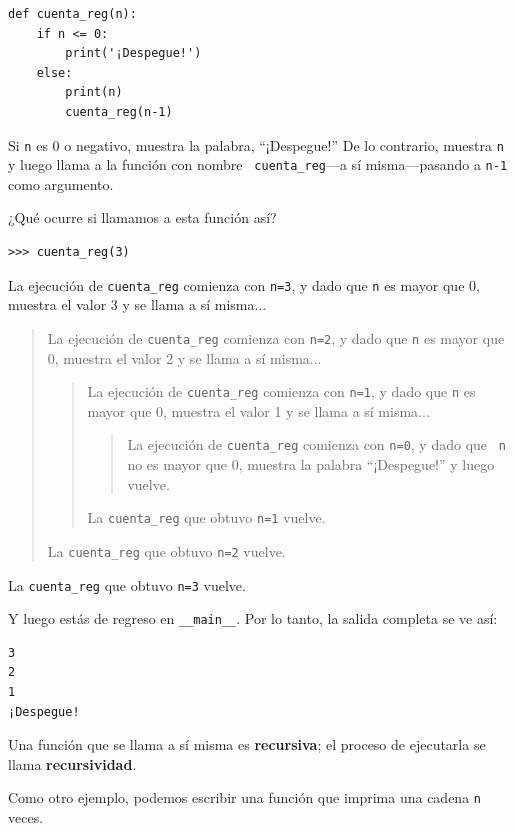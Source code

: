 \documentclass[10pt]{book}
\begin{document}
\begin{verbatim}
def cuenta_reg(n):
    if n <= 0:
        print('¡Despegue!')
    else:
        print(n)
        cuenta_reg(n-1)
\end{verbatim}
%
Si {\tt n} es 0 o negativo, muestra la palabra, ``¡Despegue!''
De lo contrario, muestra {\tt n} y luego llama a la función con nombre {\tt
cuenta\_reg}---a sí misma---pasando a {\tt n-1} como argumento.

¿Qué ocurre si llamamos a esta función así?

\begin{verbatim}
>>> cuenta_reg(3)
\end{verbatim}
%
La ejecución de {\tt cuenta\_reg} comienza con {\tt n=3}, y dado que
{\tt n} es mayor que 0, muestra el valor 3 y se llama a sí misma...

\begin{quote}
La ejecución de {\tt cuenta\_reg} comienza con {\tt n=2}, y dado que
{\tt n} es mayor que 0, muestra el valor 2 y se llama a sí misma...

\begin{quote}
La ejecución de {\tt cuenta\_reg} comienza con {\tt n=1}, y dado que
{\tt n} es mayor que 0, muestra el valor 1 y se llama a sí misma...

\begin{quote}
La ejecución de {\tt cuenta\_reg} comienza con {\tt n=0}, y dado que {\tt
n} no es mayor que 0, muestra la palabra ``¡Despegue!'' y luego
vuelve.
\end{quote}

La {\tt cuenta\_reg} que obtuvo {\tt n=1} vuelve.
\end{quote}

La {\tt cuenta\_reg} que obtuvo {\tt n=2} vuelve.
\end{quote}

La {\tt cuenta\_reg} que obtuvo {\tt n=3} vuelve.

Y luego estás de regreso en \verb"__main__".  Por lo tanto, la
salida completa se ve así:

\begin{verbatim}
3
2
1
¡Despegue!
\end{verbatim}
%
Una función que se llama a sí misma es {\bf recursiva}; el proceso de
ejecutarla se llama {\bf recursividad}.

Como otro ejemplo, podemos escribir una función que imprima una
cadena {\tt n} veces.
\end{document}
